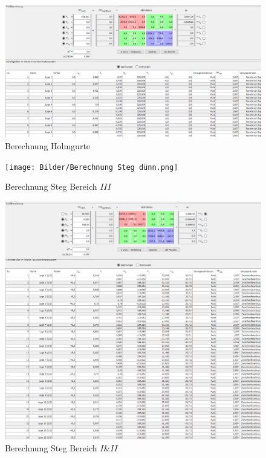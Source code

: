 \begin{figure}
	\includegraphics[width=1.0\textwidth]{Bilder/Berechnung Holmgurte.png}
	\caption{Berechnung Holmgurte}
	\label{fig:Berechnung Holmgurte}
\end{figure}
\begin{figure}
	\texttt{[image: Bilder/Berechnung Steg dünn.png]}
	\caption{Berechnung Steg Bereich $III$}
	\label{fig:Berechnung Steg dünn}
\end{figure}
\begin{figure}
	\includegraphics[width=1.0\textwidth]{Bilder/Berechnung Steg dick.png}
	\caption{Berechnung Steg Bereich $I$\&$II$}
	\label{fig:Berechnung Steg dick}
\end{figure}
